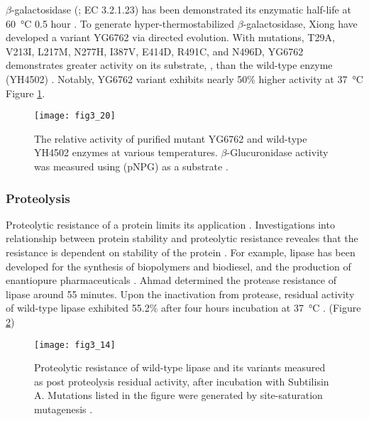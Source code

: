 \begin{refsection}
$\beta$-galactosidase (; EC 3.2.1.23)
has been demonstrated its enzymatic half-life at \SI{60}{\celsius} 0.5 hour
\cite{Melchers1970,Chen2008}. To generate hyper-thermostabilized
$\beta$-galactosidase, Xiong  have developed a variant YG6762 via
directed evolution. With mutations, T29A, V213I, L217M, N277H, I387V, E414D,
R491C, and N496D, YG6762 demonstrates greater activity on its
substrate, , than the wild-type
enzyme (YH4502) \cite{Xiong2007}. Notably, YG6762 variant exhibits nearly 50\%
higher activity at \SI{37}{\celsius} Figure \ref{fig:yg6762}.
\begin{figure}[htbp] \centering \texttt{[image: fig3\_20]}
    \caption[The relative activity of purified mutant YG6762 and wild-type
    YH4502 enzymes at various temperatures. $\beta$-Glucuronidase activity was
measured using  (pNPG) as a substrate.] {The
    relative activity of purified mutant YG6762 and wild-type YH4502 enzymes at
    various temperatures. $\beta$-Glucuronidase activity was measured using
     (pNPG) as a substrate \cite{Xiong2007}.}
    \label{fig:yg6762}
\end{figure}

\subsubsection{Proteolysis}

Proteolytic resistance of a protein limits its application
\cite{Ottesen1967,Daniel1982,Fontana2004}. Investigations into relationship
between protein stability and proteolytic resistance reveales that the
resistance is dependent on stability of the protein \cite{Daniel1982,
Parsell1989}. For example,  lipase has been developed for the
synthesis of biopolymers and biodiesel, and the production of enantiopure
pharmaceuticals \cite{Jaeger2002,Ahmad2012}. Ahmad  determined
the protease resistance of lipase around 55 minutes. Upon the inactivation from
protease, residual activity of wild-type lipase exhibited 55.2\% after four
hours incubation at \SI{37}{\celsius} \cite{Ahmad2012}. (Figure
\ref{fig:protease-resistance})
\begin{figure}[htbp] \centering \texttt{[image: fig3\_14]}
    \caption[Proteolytic resistance of wild-type lipase and its variants
    measured as post proteolysis residual activity, after incubation with
Subtilisin A. Mutations listed in the figure were generated by site-saturation
mutagenesis.]{Proteolytic resistance of wild-type lipase and its variants
    measured as post proteolysis residual activity, after incubation with
    Subtilisin A. Mutations listed in the figure were generated by
    site-saturation mutagenesis \cite{Ahmad2012}.}
    \label{fig:protease-resistance}
\end{figure}


\end{refsection}
